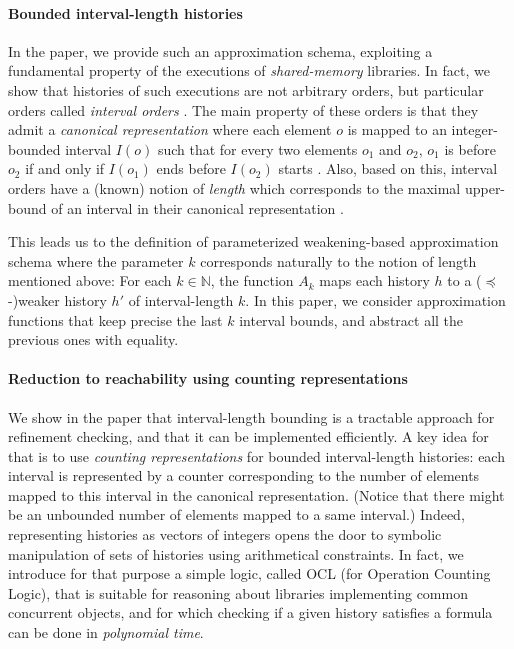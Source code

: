 \paragraph{Bounded interval-length histories}

In the paper, we provide such an approximation schema, exploiting a fundamental
property of the executions of \emph{shared-memory} libraries. In fact, we show
that histories of such executions are not arbitrary orders, but particular
orders called \emph{interval orders} \cite{}. The main property of these orders
is that they admit a \emph{canonical representation} where each element $o$ is
mapped to an integer-bounded interval $I(o)$ such that for every two elements
$o_1$ and $o_2$, $o_1$ is before $o_2$ if and only if $I(o_1)$ ends before
$I(o_2)$ starts \cite{}. Also, based on this, interval orders have a (known)
notion of \emph{length} which corresponds to the maximal upper-bound of an
interval in their canonical representation \cite{}.

This leads us to the definition of parameterized weakening-based approximation
schema where the parameter $k$ corresponds naturally to the notion of length
mentioned above: For each $k \in \mathbb{N}$, the function $A_k$ maps each
history $h$ to a ($\preceq$-)weaker history $h'$ of interval-length $k$. In
this paper, we consider approximation functions that keep precise the last $k$
interval bounds, and abstract all the previous ones with equality.

\paragraph{Reduction to reachability using counting representations}

We show in the paper that interval-length bounding is a tractable approach for
refinement checking, and that it can be implemented efficiently. A key idea for
that is to use \emph{counting representations} for bounded interval-length
histories: each interval is represented by a counter corresponding to the
number of elements mapped to this interval in the canonical representation.
(Notice that there might be an unbounded number of elements mapped to a same
interval.) Indeed, representing histories as vectors of integers opens the door
to symbolic manipulation of sets of histories using arithmetical constraints.
In fact, we introduce for that purpose a simple logic, called OCL (for
Operation Counting Logic), that is suitable for reasoning about libraries
implementing common concurrent objects, and for which checking if a given
history satisfies a formula can be done in \emph{polynomial time}.

